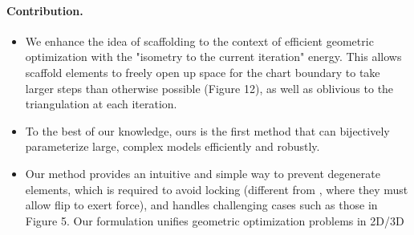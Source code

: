 \paragraph{Contribution.}
\begin{itemize}
\vspace{-1em}
\item We enhance the idea of scaffolding to the context of efficient geometric optimization with the "isometry to the current iteration" energy. This allows scaffold elements to freely open up space for the chart boundary to take larger steps than otherwise possible (Figure 12), as well as oblivious to the triangulation at each iteration.
\item To the best of our knowledge, ours is the first method that can bijectively parameterize large, complex models efficiently and robustly.
\item Our method provides an intuitive and simple way to prevent degenerate elements, which is required to avoid locking (different from \cite{Muller:2015}, where they must allow flip to exert force), and handles challenging cases such as those in Figure 5. 
Our formulation unifies geometric optimization problems in 2D/3D
\end{itemize}
